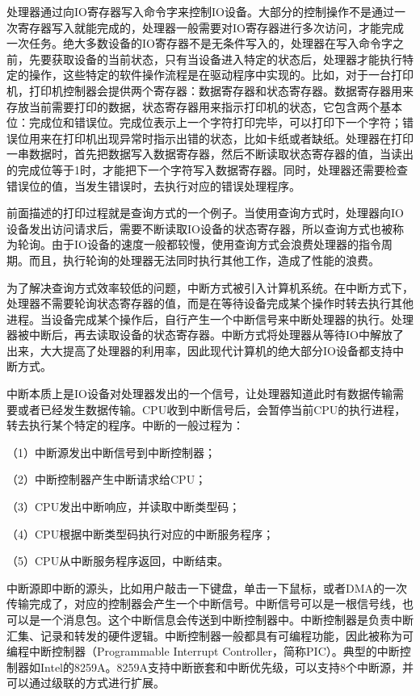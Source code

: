 \documentclass[]{ctexbook}
\begin{document}
处理器通过向IO寄存器写入命令字来控制IO设备。大部分的控制操作不是通过一次寄存器写入就能完成的，处理器一般需要对IO寄存器进行多次访问，才能完成一次任务。绝大多数设备的IO寄存器不是无条件写入的，处理器在写入命令字之前，先要获取设备的当前状态，只有当设备进入特定的状态后，处理器才能执行特定的操作，这些特定的软件操作流程是在驱动程序中实现的。比如，对于一台打印机，打印机控制器会提供两个寄存器：数据寄存器和状态寄存器。数据寄存器用来存放当前需要打印的数据，状态寄存器用来指示打印机的状态，它包含两个基本位：完成位和错误位。完成位表示上一个字符打印完毕，可以打印下一个字符；错误位用来在打印机出现异常时指示出错的状态，比如卡纸或者缺纸。处理器在打印一串数据时，首先把数据写入数据寄存器，然后不断读取状态寄存器的值，当读出的完成位等于1时，才能把下一个字符写入数据寄存器。同时，处理器还需要检查错误位的值，当发生错误时，去执行对应的错误处理程序。

前面描述的打印过程就是查询方式的一个例子。当使用查询方式时，处理器向IO设备发出访问请求后，需要不断读取IO设备的状态寄存器，所以查询方式也被称为轮询。由于IO设备的速度一般都较慢，使用查询方式会浪费处理器的指令周期。而且，执行轮询的处理器无法同时执行其他工作，造成了性能的浪费。

为了解决查询方式效率较低的问题，中断方式被引入计算机系统。在中断方式下，处理器不需要轮询状态寄存器的值，而是在等待设备完成某个操作时转去执行其他进程。当设备完成某个操作后，自行产生一个中断信号来中断处理器的执行。处理器被中断后，再去读取设备的状态寄存器。中断方式将处理器从等待IO中解放了出来，大大提高了处理器的利用率，因此现代计算机的绝大部分IO设备都支持中断方式。

中断本质上是IO设备对处理器发出的一个信号，让处理器知道此时有数据传输需要或者已经发生数据传输。CPU收到中断信号后，会暂停当前CPU的执行进程，转去执行某个特定的程序。中断的一般过程为：

（1）中断源发出中断信号到中断控制器；

（2）中断控制器产生中断请求给CPU；

（3）CPU发出中断响应，并读取中断类型码；

（4）CPU根据中断类型码执行对应的中断服务程序；

（5）CPU从中断服务程序返回，中断结束。

中断源即中断的源头，比如用户敲击一下键盘，单击一下鼠标，或者DMA的一次传输完成了，对应的控制器会产生一个中断信号。中断信号可以是一根信号线，也可以是一个消息包。这个中断信息会传送到中断控制器中。中断控制器是负责中断汇集、记录和转发的硬件逻辑。中断控制器一般都具有可编程功能，因此被称为可编程中断控制器（Programmable Interrupt Controller，简称PIC）。典型的中断控制器如Intel的8259A。8259A支持中断嵌套和中断优先级，可以支持8个中断源，并可以通过级联的方式进行扩展。
\end{document}
